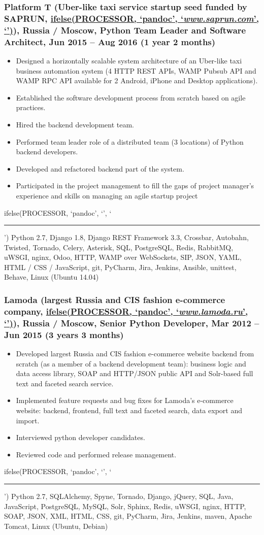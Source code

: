 \documentclass[a4paper,8pt]{extarticle}
\newcommand{\chref}[2]{\href{#1}
{ifelse(PROCESSOR, `pandoc', `#2', `\underline{\smash{#2}}')}}
\newcommand{\itchref}[2]{\chref{#1}{\textit{#2}}}  %
\newcommand{\chrule}{ifelse(PROCESSOR, `pandoc', `', `\vspace{3pt}\hrule')}
\begin{document}
\subsubsection*{Platform T (Uber-like taxi service startup seed funded by SAPRUN, \itchref{https://www.saprun.com}{www.saprun.com}), Russia / Moscow, Python Team Leader and Software Architect, Jun 2015 – Aug 2016 (1 year 2 months)}
\begin{itemize}
    \item Designed a horizontally scalable system architecture of an Uber-like taxi business automation system (4 HTTP REST APIs, WAMP Pubsub API and WAMP RPC API available for 2 Android, iPhone and Desktop applications).
    \item Established the software development process from scratch based on agile practices.
    \item Hired the backend development team.
    \item Performed team leader role of a distributed team (3 locations) of Python backend developers.
    \item Developed and refactored backend part of the system.
    \item Participated in the project management to fill the gaps of project manager's experience and skills on managing an agile startup project
\end{itemize}
\chrule
Python 2.7, Django 1.8, Django REST Framework 3.3, Crossbar, Autobahn, Twisted, Tornado, Celery, Asterisk, SQL, PostgreSQL, Redis, RabbitMQ, uWSGI, nginx, Odoo, HTTP, WAMP over WebSockets, SIP, JSON, YAML, HTML / CSS / JavaScript, git, PyCharm, Jira, Jenkins, Ansible, unittest, Behave, Linux (Ubuntu 14.04)

\subsubsection*{Lamoda (largest Russia and CIS fashion e-commerce company, \itchref{https://www.lamoda.ru}{www.lamoda.ru}), Russia / Moscow, Senior Python Developer, Mar 2012 – Jun 2015 (3 years 3 months)}
\begin{itemize}
    \item Developed largest Russia and CIS fashion e-commerce website backend from scratch (as a member of a backend development team): business logic and data access library, SOAP and HTTP/JSON public API and Solr-based full text and faceted search service.
    \item Implemented feature requests and bug fixes for Lamoda's e-commerce website: backend, frontend, full text and faceted search, data export and import.
    \item Interviewed python developer candidates.
    \item Reviewed code and performed release management.
\end{itemize}
\chrule
Python 2.7, SQLAlchemy, Spyne, Tornado, Django, jQuery, SQL, Java, JavaScript, PostgreSQL, MySQL, Solr, Sphinx, Redis, uWSGI, nginx, HTTP, SOAP, JSON, XML, HTML, CSS, git, PyCharm, Jira, Jenkins, maven, Apache Tomcat, Linux (Ubuntu, Debian)
\end{document}
